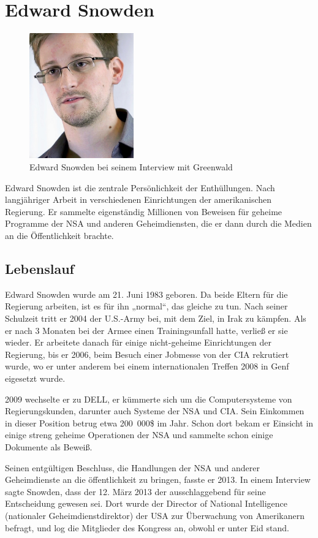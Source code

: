 \documentclass[12pt,a4paper]{scrartcl}
\begin{document}
\section{Edward Snowden}
\begin{figure}
\centering
\includegraphics[width=0.4\textwidth]{images/snowden.jpg}
\caption{Edward Snowden bei seinem Interview mit Greenwald}
\end{figure}
Edward Snowden ist die zentrale Persönlichkeit der Enthüllungen. Nach langjähriger Arbeit in verschiedenen Einrichtungen der amerikanischen Regierung. Er sammelte eigenständig Millionen von Beweisen für geheime Programme der NSA und anderen Geheimdiensten, die er dann durch die Medien an die Öffentlichkeit brachte.

\subsection{Lebenslauf}
Edward Snowden wurde am 21. Juni 1983 geboren.
Da beide Eltern für die Regierung arbeiten, ist es für ihn „normal“, das gleiche zu tun.
Nach seiner Schulzeit tritt er 2004 der U.S.-Army bei, mit dem Ziel, in Irak zu kämpfen. Als er nach 3 Monaten bei der Armee einen Trainingsunfall hatte, verließ er sie wieder.
Er arbeitete danach für einige nicht-geheime Einrichtungen der Regierung, bis er 2006, beim Besuch einer Jobmesse von der CIA rekrutiert wurde, wo er unter anderem bei einem internationalen Treffen 2008 in Genf eigesetzt wurde.
\cite{wiki_snowden}

2009 wechselte er zu DELL, er kümmerte sich um die Computersysteme von Regierungskunden, darunter auch Systeme der NSA und CIA. Sein Einkommen in dieser Position betrug etwa 200~000\$ im Jahr.
Schon dort bekam er Einsicht in einige streng geheime Operationen der NSA und sammelte schon einige Dokumente als Beweiß.

Seinen entgültigen Beschluss, die Handlungen der NSA und anderer Geheimdienste an die öffentlichkeit zu bringen, fasste er 2013. In einem Interview sagte Snowden, dass der 12. März 2013 der ausschlaggebend für seine Entscheidung gewesen sei. Dort wurde der Director of National Intelligence (nationaler Geheimdienstdirektor) der USA zur Überwachung von Amerikanern befragt, und log die Mitglieder des Kongress an, obwohl er unter Eid stand.
\end{document}
